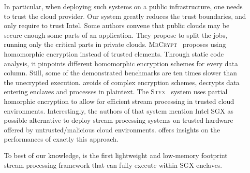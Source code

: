 In particular, when deploying such systems on a public infrastructure, one needs to trust the cloud provider.
Our system greatly reduces the trust boundaries, and only require to trust Intel.
% 
Some authors convene that public clouds may be secure enough some parts of an application.
They propose to split the jobs, running only the critical parts in private clouds.
% 
\textsc{MrCrypt}~\cite{tetali2013mrcrypt} proposes using homomorphic encryption instead of trusted elements.
Through static code analysis, it pinpoints different homomorphic encryption schemes for every data column.
Still, some of the demonstrated benchmarks are ten times slower than the unecrypted execution.
\SYS{} avoids of complex encryption schemes, decrypts data entering enclaves and processes in plaintext.
% 
The \textsc{Styx}~\cite{Stephen:2016:SSP:2987550.2987574} system uses partial homorphic encryption to allow for efficient stream processing in trusted cloud environments.
Interestingly, the authors of that system mention Intel SGX as possible alternative to deploy stream processing systems on trusted hardware offered by untrusted/malicious cloud environments.
\SYS{} offers insights on the performances of exactly this approach. 

To best of our knowledge, \SYS{} is the first lightweight and low-memory footprint stream processing framework that can fully execute within SGX enclaves.
